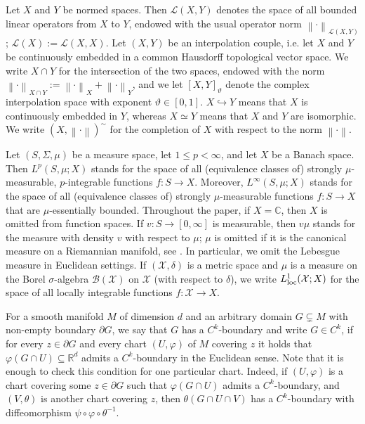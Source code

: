 \documentclass[12pt,a4paper, reqno]{amsart}
\theoremstyle{plain}
\theoremstyle{definition}
\theoremstyle{remark}
\numberwithin{equation}{section}
\newcommand{\1}{\mathbbm{1}}
\newcommand{\R}{\ensuremath{\mathbb{R}}}
\newcommand{\C}{\ensuremath{\mathbb{C}}}
\newcommand{\calX}{\ensuremath{\mathcal{X}}}
\newcommand{\calB}{\ensuremath{\mathcal{B}}}
\newcommand{\scrL}{\ensuremath{\mathscr{L}}}
\newcommand{\nrm}[1]{\left\lVert #1 \right\rVert}
\begin{document}
Let $X$ and $Y$ be normed spaces. Then $\scrL(X,Y)$ denotes the space of all bounded linear operators from $X$ to $Y$, endowed with the usual operator norm $\nrm{\cdot}_{\scrL(X,Y)}$; $\scrL(X):=\scrL(X,X)$. 
Let $(X,Y)$ be an interpolation couple, i.e. let $X$ and $Y$ be continuously embedded in a common Hausdorff topological vector space.
We write $X\cap Y$ for the intersection of the two spaces, endowed with the norm $\nrm{\cdot}_{X\cap Y}:= \nrm{\cdot}_{X}+\nrm{\cdot}_{Y}$,
and we let $[X,Y]_\vartheta$ denote the complex interpolation space with exponent $\vartheta\in [0,1]$.
$X\hookrightarrow Y$ means that $X$ is continuously embedded in $Y$, whereas $X\simeq Y$ means that $X$ and $Y$ are isomorphic.
 We write $(X,\nrm{\cdot})^\sim$ for the completion of $X$ with respect to the norm $\nrm{\cdot}$.

Let $(S,\Sigma,\mu)$ be a measure space, let $1\leq p<\infty$, and let $X$ be a Banach space. Then $L^p(S,\mu;X)$ stands for the space of all (equivalence classes of) strongly $\mu$-measurable, $p$-inte\-grable functions $f\colon S\to X$. 
Moreover, $L^\infty(S,\mu;X)$ stands for the space of all (equivalence classes of) strongly $\mu$-measu\-rable functions $f\colon S\to X$ that are $\mu$-essentially bounded.
Throughout the paper, if $X=\C$, then $X$ is omitted from function spaces.
If $v\colon S\to[0,\infty]$ is measurable, then $v\mu$ stands for the measure with density $v$ 
with respect to $\mu$; $\mu$ is omitted if it is the 
 canonical measure on a Riemannian manifold, see \cite[Section~3.4]{Grigoryan2009_Book}. In particular, we omit the Lebesgue measure in Euclidean settings.
If $(\calX,\delta)$ is a metric space and $\mu$ is a measure on the Borel $\sigma$-algebra $\calB(\calX)$ on $\calX$ (with respect to  $\delta$), we write $L^1_\textup{loc}(\calX;X)$ for the space of all locally integrable functions $f\colon \calX\rightarrow X$.

For a smooth manifold $M$ of dimension $d$ and an arbitrary domain $G\subsetneq M$ with non-empty boundary $\partial G$, we say that $G $ has a $C^k$-boundary and write $G\in C^k$,
if for every $z\in \partial G$ and every chart $(U,\varphi)$ of $M$ covering $z$ it holds that $\varphi(G\cap U)\subseteq\R^d$ admits a $C^k$-boundary in the Euclidean sense. Note that it is enough to check this condition for one particular chart. Indeed, if $(U,\varphi)$ is a chart covering some $z\in\partial G$ such that $\varphi(G\cap U)$ admits a $C^k$-boundary, and $(V,\theta)$ is another chart covering $z$, then $\theta(G\cap U\cap V)$ has a $C^k$-boundary with diffeomorphism $\psi\circ\varphi\circ \theta^{-1}$. 
\end{document}

